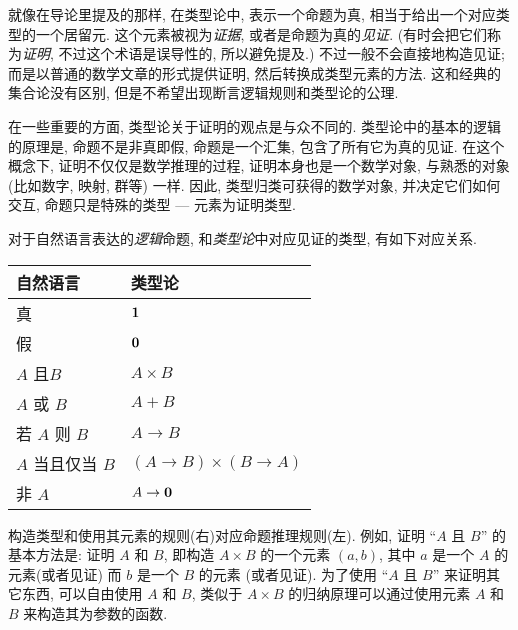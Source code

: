 %
%
就像在导论里提及的那样, 在类型论中, 表示一个命题为真, 相当于给出一个对应类型的一个居留元. %
%
这个元素被视为\emph{证据}, 或者是命题为真的\emph{见证}.
(有时会把它们称为\emph{证明}, 不过这个术语是误导性的, 所以避免提及.)
不过一般不会直接地构造见证;
而是以普通的数学文章的形式提供证明, 然后转换成类型元素的方法.
这和经典的集合论没有区别, 但是不希望出现断言逻辑规则和类型论的公理.

在一些重要的方面, 类型论关于证明的观点是与众不同的.
类型论中的基本的逻辑的原理是, 命题不是非真即假, 命题是一个汇集, 包含了所有它为真的见证.
在这个概念下, 证明不仅仅是数学推理的过程, 证明本身也是一个数学对象, 与熟悉的对象(比如数字, 映射, 群等) 一样.
因此, 类型归类可获得的数学对象, 并决定它们如何交互, 命题只是特殊的类型 --- 元素为证明类型.

%
%
对于自然语言表达的\emph{逻辑}命题, 和\emph{类型论}中对应见证的类型, 有如下对应关系.
%
%
%
%
%
\begin{center}
    \medskip
    \begin{tabular}{ll}
        \toprule
        自然语言         & 类型论                          \\
        \midrule
        真            & $\mathbf{1}$                      \\
        假            & $\mathbf{0}$                    \\
        $A$ 且$B$     & $A \times B$                 \\
        $A$ 或 $B$    & $A + B$                      \\
        若 $A$ 则 $B$  & $A \to B$                    \\
        $A$ 当且仅当 $B$ & $(A \to B) \times (B \to A)$ \\
        非 $A$        & $A \to \mathbf{0}$              \\
        \bottomrule
    \end{tabular}
    \medskip
\end{center}

构造类型和使用其元素的规则(右)对应命题推理规则(左).
例如, 证明 ``$A$ 且 $B$'' 的基本方法是: 证明 $A$ 和 $B$, 即构造 $A\times B$ 的一个元素 $(a,b)$, 其中 $a$ 是一个 $A$ 的元素(或者见证) 而 $b$ 是一个 $B$ 的元素 (或者见证).
为了使用 ``$A$ 且 $B$'' 来证明其它东西, 可以自由使用 $A$ 和 $B$, 类似于 $A\times B$ 的归纳原理可以通过使用元素 $A$ 和 $B$ 来构造其为参数的函数.

